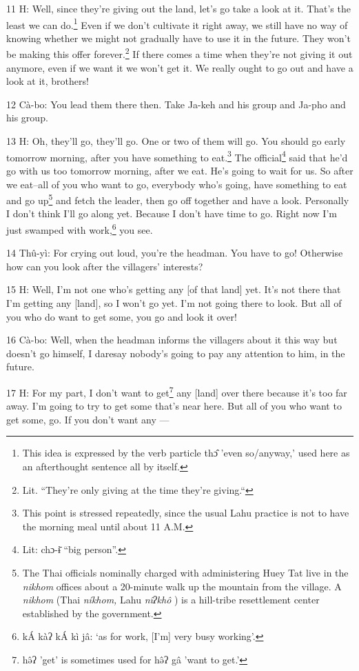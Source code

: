 11 H: Well, since they're giving out the land, let's go take a look at it. That's
the least we can do.\footnote{This idea is expressed by the verb particle thɔ̂ 'even so/anyway,' used here as an afterthought sentence all by itself.} Even if we don't cultivate it right away, we still have
no way of knowing whether we might not gradually have to use it in the future.
They won't be making this offer forever.\footnote{Lit. ``They're only giving at the time they're giving.``} If there comes a time when they're
not giving it out anymore, even if we want it we won't get it. We really ought
to go out and have a look at it, brothers!

12 Cà-bo: You lead them there then. Take Ja-keh and his group and Ja-pho and his
group.

13 H: Oh, they'll go, they'll go. One or two of them will go. You should go early
tomorrow morning, after you have something to eat.\footnote{This point is stressed repeatedly, since the usual Lahu practice is not to have the morning meal until about 11 A.M.} The official\footnote{Lit: chɔ-ɨ̄ ``big person''.} said that
he'd go with us too tomorrow morning, after we eat. He's going to wait for us.
So after we eat--all of you who want to go, everybody who's going, have something
to eat and go up\footnote{The Thai officials nominally charged with administering Huey Tat live in the \textit{nikhom } offices about a 20-minute walk up the mountain from the village. A  \textit{nikhom } (Thai  \textit{níkhom,  }Lahu  \textit{nîʔkhô }) is a hill-tribe resettlement center established by the government.} and fetch the leader, then go off together and have a look.
Personally I don't think I'll go along yet. Because I don't have time to go. Right
now I'm just swamped with work,\footnote{kÁ kàʔ kÁ kì jâ: `as for work, [I'm] very busy working'.} you see.

14 Thû-yì: For crying out loud, you're the headman. You have to go! Otherwise
how can you look after the villagers' interests?

15 H: Well, I'm not one who's getting any [of that land] yet. It's not there that
I'm getting any [land], so I won't go yet. I'm not going there to look. But all
of you who do want to get some, you go and look it over!

16 Cà-bo: Well, when the headman informs the villagers about it this way but doesn't
go himself, I daresay nobody's going to pay any attention to him, in the future.

17 H: For my part, I don't want to get\footnote{hə̂ʔ 'get' is sometimes used for hə̂ʔ gâ 'want to get.'} any [land] over there because it's too
far away. I'm going to try to get some that's near here. But all of you who want
to get some, go. If you don't want any ---

